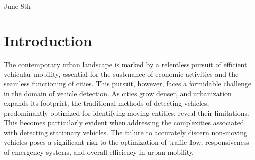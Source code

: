 \documentclass[12pt]{report}
\begin{document}
\begin{titlepage}
		
		{\large June 8th}\\[1cm] %
		
		
		
		
		\vfill %
		
	\end{titlepage}
	
	\setcounter{page}{2}
	\pagestyle{fancy}
	\fancyhf{}
	\rhead{\thepage}
	
	
	\tableofcontents
	\newpage
	\listoffigures
	\newpage
	\listoftables
	

	\printglossary[type=acronym,title=List of Abbreviations]
	
	
	
	\chapter{Introduction}
	

	
	The contemporary urban landscape is marked by a relentless pursuit of efficient vehicular mobility, essential for the sustenance of economic activities and the seamless functioning of cities. This pursuit, however, faces a formidable challenge in the domain of vehicle detection. As cities grow denser, and urbanization expands its footprint, the traditional methods of detecting vehicles, predominantly optimized for identifying moving entities, reveal their limitations. This becomes particularly evident when addressing the complexities associated with detecting stationary vehicles. The failure to accurately discern non-moving vehicles poses a significant risk to the optimization of traffic flow, responsiveness of emergency systems, and overall efficiency in urban mobility.
	
\end{document}
